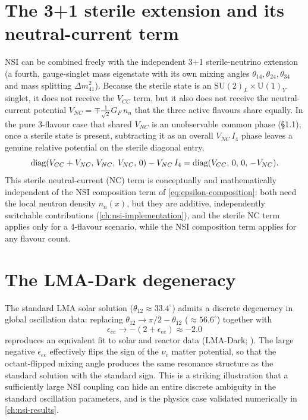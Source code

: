 \section{The 3+1 sterile extension and its neutral-current term}

\begin{theorybox}
NSI can be combined freely with the independent 3+1 sterile-neutrino
extension (a fourth, gauge-singlet mass eigenstate with its own mixing
angles $\theta_{14},\theta_{24},\theta_{34}$ and mass splitting
$\Delta m^2_{41}$). Because the sterile state is an
$\mathrm{SU}(2)_L\times\mathrm{U}(1)_Y$ singlet, it does not receive the
$V_{CC}$ term, but it also does not receive the neutral-current potential
$V_{NC}=\mp\frac{1}{\sqrt2}G_F\,n_n$ that the three active flavours share
equally. In the pure 3-flavour case that shared $V_{NC}$ is an unobservable
common phase (\S1.1); once a sterile state is present, subtracting it as an
overall $V_{NC}\,I_4$ phase leaves a genuine relative potential on the
sterile diagonal entry,
\begin{equation}
  \operatorname{diag}(V_{CC}+V_{NC},\,V_{NC},\,V_{NC},\,0) - V_{NC}\,I_4
  = \operatorname{diag}(V_{CC},\,0,\,0,\,-V_{NC}).
\end{equation}
This sterile neutral-current (NC) term is conceptually and mathematically
independent of the NSI composition term of
\cref{eq:epsilon-composition}: both need the local neutron density
$n_n(x)$, but they are additive, independently switchable contributions
(\cref{ch:nsi-implementation}), and the sterile NC term applies only for a
4-flavour scenario, while the NSI composition term applies for any flavour
count.
\end{theorybox}

\section{The LMA-Dark degeneracy}
\label{sec:theory-lma-dark}

\begin{theorybox}
The standard LMA solar solution ($\theta_{12}\approx33.4^\circ$) admits a
discrete degeneracy in global oscillation data: replacing
$\theta_{12}\to\pi/2-\theta_{12}$ ($\approx56.6^\circ$) together with
\begin{equation}
  \epsilon_{ee} \to -(2+\epsilon_{ee}) \approx -2.0
\end{equation}
reproduces an equivalent fit to solar and reactor data (LMA-Dark;
\parencite{Esteban2018LMADark}). The large negative $\epsilon_{ee}$
effectively flips the sign of the $\nu_e$ matter potential, so that the
octant-flipped mixing angle produces the same resonance structure as the
standard solution with the standard sign. This is a striking illustration
that a sufficiently large NSI coupling can hide an entire discrete ambiguity
in the standard oscillation parameters, and is the physics case validated
numerically in \cref{ch:nsi-results}.
\end{theorybox}

